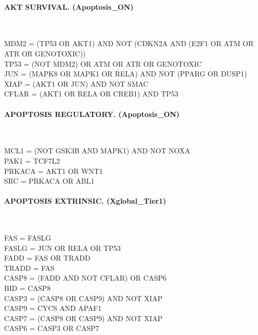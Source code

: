 \paragraph{AKT SURVIVAL. (Apoptosis\_ON)}\mbox{}\\
\begin{flushleft}\ttfamily\small
MDM2 = (TP53 OR AKT1) AND NOT (CDKN2A AND (E2F1 OR ATM OR ATR OR GENOTOXIC))\\
TP53 = (NOT MDM2) OR ATM OR ATR OR GENOTOXIC\\
JUN = (MAPK8 OR MAPK1 OR RELA) AND NOT (PPARG OR DUSP1)\\
XIAP = (AKT1 OR JUN) AND NOT SMAC\\
CFLAR = (AKT1 OR RELA OR CREB1) AND TP53\\
\end{flushleft}

\paragraph{APOPTOSIS REGULATORY. (Apoptosis\_ON)}\mbox{}\\
\begin{flushleft}\ttfamily\small
MCL1 = (NOT GSK3B AND MAPK1) AND NOT NOXA\\
PAK1 = TCF7L2\\
PRKACA = AKT1 OR WNT1\\
SRC = PRKACA OR ABL1\\
\end{flushleft}

\paragraph{APOPTOSIS EXTRINSIC. (Xglobal\_Tier1)}\mbox{}\\
\begin{flushleft}\ttfamily\small
FAS = FASLG\\
FASLG = JUN OR RELA OR TP53\\
FADD = FAS OR TRADD\\
TRADD = FAS\\
CASP8 = (FADD AND NOT CFLAR) OR CASP6\\
BID = CASP8\\
CASP3 = (CASP8 OR CASP9) AND NOT XIAP\\
CASP9 = CYCS AND APAF1\\
CASP7 = (CASP8 OR CASP9) AND NOT XIAP\\
CASP6 = CASP3 OR CASP7\\
\end{flushleft}

